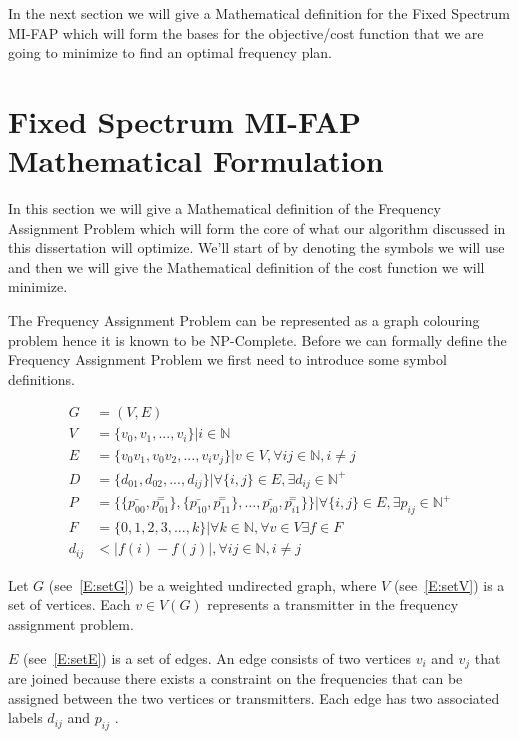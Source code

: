 In the next section we will give a Mathematical definition for the Fixed Spectrum MI-FAP which will form the bases for the objective/cost function that we are going to minimize to find an optimal frequency plan.
\section{Fixed Spectrum MI-FAP Mathematical Formulation}
In this section we will give a Mathematical definition of the Frequency Assignment Problem which will form the core of what our algorithm discussed in this dissertation will optimize. We'll start of by denoting the symbols we will use and then we will give the Mathematical definition of the cost function we will minimize.

The Frequency Assignment Problem can be represented as a graph colouring problem hence it is known to be NP-Complete. Before we can formally define the Frequency Assignment Problem we first need to introduce some symbol definitions.

\begin{align}
	G &= (V,E) \label{E:setG}\\
	V &= \{v_{0},v_{1},...,v_{i}\} | i \in \mathbb{N} \label{E:setV}\\
	E &= \{v_0v_1,v_0v_2,...,v_iv_j\}|v \in V,\forall ij \in \mathbb{N},i \neq j \label{E:setE}\\
	D &= \{d_{01},d_{02},...,d_{ij}\}| \forall\{i,j\} \in E, \exists d_{ij} \in \mathbb{N}^+ \label{E:setD}\\
	P &= \{\{\bar{p_{00}},\overset{=}{p_{01}}\},\{\bar{p_{10}},\overset{=}{p_{11}}\},\ldots,\bar{p_{i0}},\overset{=}{p_{i1}}\}\}| \forall \{i,j\} \in E,\exists p_{ij} \in \mathbb{N}^+ \label{E:setP}\\
	F &= \{0,1,2,3,...,k\}| \forall k \in \mathbb{N},\forall v \in V \exists f \in F\label{E:setF}\\
	d_{ij} &< |f(i) - f(j)|, \forall ij \in \mathbb{N},i \neq j \label{E:interference}
\end{align}

Let $G$ (see~\ref{E:setG}) be a weighted undirected graph, where $V$ (see~\ref{E:setV}) is a set of vertices. Each $v \in V(G)$ represents a transmitter in the frequency assignment problem. 

$E$ (see~\ref{E:setE}) is a set of edges. An edge consists of two vertices $v_i$ and $v_j$ that are joined because there exists a constraint on the frequencies that can be assigned between the two vertices or transmitters. Each edge has two associated labels $d_{ij}$ and $p_{ij}$ \cite{FAPOrientationModel,TabuMontemanniSmith}. 

